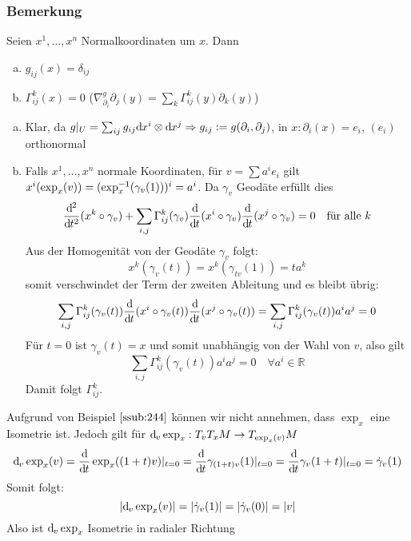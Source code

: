 \subsubsection{Bemerkung}
\label{ssub:247}
Seien $x^1,\ldots,x^n$ Normalkoordinaten um $x$. Dann
\begin{enumerate}[(a)]
\item $g_{ij}(x) = \delta_{ij}$
\item $\Gamma^k_{ij}(x) = 0$ ($\nabla_{\partial_i}^g \partial_j(y) = \sum_k \Gamma^k_{ij} (y) \partial_k(y)$)
\end{enumerate}
\begin{enumerate}[(a)]
\item Klar, da $g\vert_U = \sum_{ij} g_{ij} \mathrm{d}\mkern-1.0mu x^i \otimes \mathrm{d}\mkern-1.0mu x^j\Rightarrow g_{ij} := g(\partial_i,\partial_j)$, in $x: \partial_i(x) = e_i$, $(e_i)$ orthonormal
\item Falls $x^1,\ldots,x^n$ normale Koordinaten, für $v = \sum a^i e_i$ gilt $x^i(\exp_x(v)) = (\exp^{-1}_x(\gamma_v(1)))^i = a^i$. Da $\gamma_v$ Geodäte erfüllt dies
\[
\frac{\mathrm{d}\mkern-1.0mu^2}{\mathrm{d}\mkern-1.0mu t^2}(x^k\circ \gamma_v) + \sum_{i,j} \Gamma_{ij}^k (\gamma_v) \frac{\mathrm{d}\mkern-1.0mu}{\mathrm{d}\mkern-1.0mu t}(x^i \circ \gamma_v) \frac{\mathrm{d}\mkern-1.0mu}{\mathrm{d}\mkern-1.0mu t}(x^j \circ \gamma_v) = 0\quad \text{für alle}\ k
\]
Aus der Homogenität von der Geodäte $\gamma_v$ folgt:
\[
x^k(\gamma_v(t)) = x^k(\gamma_{tv}(1)) = ta^k
\]
somit verschwindet der Term der zweiten Ableitung und es bleibt übrig:
\[
\sum_{i,j} \Gamma_{ij}^k (\gamma_v(t)) \frac{\mathrm{d}\mkern-1.0mu}{\mathrm{d}\mkern-1.0mu t}(x^i \circ \gamma_v(t)) \frac{\mathrm{d}\mkern-1.0mu}{\mathrm{d}\mkern-1.0mu t}(x^j \circ \gamma_v(t)) = \sum_{i,j} \Gamma_{ij}^k (\gamma_v(t)) a^i a^j = 0
\]
Für $t=0$ ist $\gamma_v(t) = x$ und somit unabhängig von der Wahl von $v$, also gilt
\[
\sum_{i,j} \Gamma_{ij}^k (\gamma_v(t)) a^i a^j = 0\quad \forall a^i \in \mathds{R}
\]
Damit folgt $\Gamma_{ij}^k$.
\end{enumerate}
Aufgrund von Beispiel $\ref{ssub:244}$ können wir nicht annehmen, dass $\exp_x$ eine Isometrie ist. Jedoch gilt für $\mathrm{d}\mkern-1.0mu_v \exp_x: T_v T_x M \to T_{\exp_x(v)} M$
\[
\mathrm{d}\mkern-1.0mu_v \exp_x(v) = \frac{\mathrm{d}\mkern-1.0mu}{\mathrm{d}\mkern-1.0mu t} \exp_x ((1+t)v)\vert_{t=0} = \frac{\mathrm{d}\mkern-1.0mu}{\mathrm{d}\mkern-1.0mu t} \gamma_{(1+t)v}(1)\vert_{t=0} = \frac{\mathrm{d}\mkern-1.0mu}{\mathrm{d}\mkern-1.0mu t} \gamma_v(1+t)\vert_{t=0} = \dot{\gamma}_v (1) 
\]
Somit folgt:
\[
\lvert\mathrm{d}\mkern-1.0mu_v \exp_x(v)\rvert = \lvert\dot{\gamma}_v (1)\rvert = \lvert\dot{\gamma}_v (0)\rvert = \lvert v\rvert
\]
Also ist $\mathrm{d}\mkern-1.0mu_v \exp_x$ Isometrie in radialer Richtung


